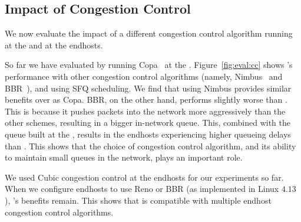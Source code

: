 \subsection{Impact of Congestion Control}\label{s:eval:cc}

We now evaluate the impact of a different congestion control algorithm running at the \inbox and at the endhosts.



 So far we have evaluated \name by running Copa~\cite{copa} at the \inbox.  
Figure~\ref{fig:eval:cc} shows \name's performance with other congestion control algorithms (namely, Nimbus~\cite{nimbus} and BBR~\cite{bbr}), and using SFQ scheduling. 
We find that using Nimbus provides similar benefits over \baseline as Copa. 
BBR, on the other hand, performs slightly worse than \baseline. 
This is because it pushes packets into the network more aggressively than the other schemes, resulting in a bigger in-network queue.
This, combined with the queue built at the \name, results in the endhosts experiencing higher queueing delays than \baseline. This shows that the choice of congestion control algorithm, and its ability to maintain small queues in the network, plays an important role. 


We used Cubic congestion control at the endhosts for our experiments so far. When we configure endhosts to use Reno or BBR (as implemented in Linux $4.13$), \name's benefits remain.
This shows that \name is compatible with multiple endhost congestion control algorithms.
